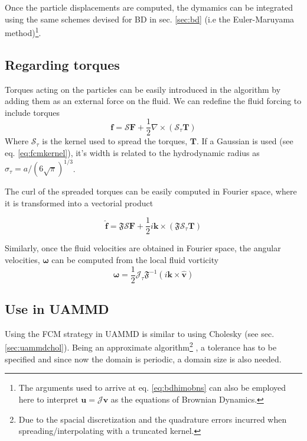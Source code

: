 \documentclass[ twoside,openright,titlepage,numbers=noenddot,%
headinclude,footinclude,cleardoublepage=empty,abstract=on,
BCOR=5mm,paper=a4,fontsize=11pt, dvipsnames
]{scrreprt}
\renewcommand{\vec}[1]{\bm{#1}}
\newcommand{\oper}[1]{\mathcal{#1}}
\newcommand{\uammd}{\gls{UAMMD}\xspace}
\newcommand{\half}{\frac{1}{2}}
\newcommand{\fou}[1]{\widehat{#1}}
\newcommand{\pvel}{u}
\newcommand{\fvel}{v}
\begin{document}
Once the particle displacements are computed, the dymamics can be integrated using the same schemes devised for \gls{BD} in sec. \ref{sec:bd} (i.e the Euler-Maruyama method)\footnote{The arguments used to arrive at eq. \eqref{eq:bdhimobns} can also be employed here to interpret $\vec{\pvel}=\oper{J}\vec{\fvel}$ as the equations of Brownian Dynamics.}.

\subsection*{Regarding torques}

Torques acting on the particles can be easily introduced in the algorithm by adding them as an external force on the fluid. We can redefine the fluid forcing to include torques
\begin{equation}
\vec{f} = \oper{S}\vec{F} + \half\nabla\times(\oper{S}_\tau\vec{T})
\end{equation}
Where $\oper{S}_\tau$ is the kernel used to spread the torques, $\vec{T}$. If a Gaussian is used (see eq. \eqref{eq:fcmkernel}), it's width is related to the hydrodynamic radius as $\sigma_\tau = a/(6\sqrt{\pi})^{1/3}$.

The curl of the spreaded torques can be easily computed in Fourier space, where it is transformed into a vectorial product

\begin{equation}
\fou{\vec{f}} = \mathfrak{F}\oper{S}\vec{F} + \half i\vec{k}\times(\mathfrak{F}\oper{S}_\tau\vec{T})
\end{equation}

Similarly, once the fluid velocities are obtained in Fourier space, the angular velocities, $\vec{\omega}$ can be computed from the local fluid vorticity
\begin{equation}
  \vec{\omega} = \half\oper{J}_\tau\mathfrak{F}^{-1}\left(i\vec{k}\times\fou{\vec{\fvel}}\right)
\end{equation}


\subsection*{Use in UAMMD}
Using the \gls{FCM} strategy in \uammd is similar to using Cholesky (see sec. \ref{sec:uammdchol}). Being an approximate algorithm\footnote{Due to the spacial discretization and the quadrature errors incurred when spreading/interpolating with a truncated kernel.} , a tolerance has to be specified and since now the domain is periodic, a domain size is also needed.
\end{document}
